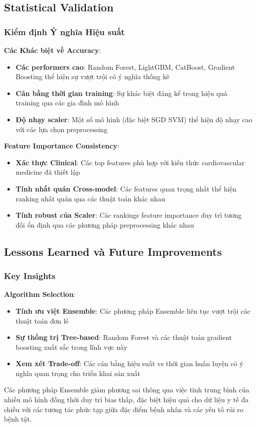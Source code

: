 \subsection{Statistical Validation}\label{subsec:detailed-statistical-validation}

\subsubsection{Kiểm định Ý nghĩa Hiệu suất}

\textbf{Các Khác biệt về Accuracy}:
\begin{itemize}
    \item \textbf{Các performers cao}: Random Forest, LightGBM, CatBoost, Gradient Boosting thể hiện sự vượt trội có ý nghĩa thống kê
    \item \textbf{Cân bằng thời gian training}: Sự khác biệt đáng kể trong hiệu quả training qua các gia đình mô hình
    \item \textbf{Độ nhạy scaler}: Một số mô hình (đặc biệt SGD SVM) thể hiện độ nhạy cao với các lựa chọn preprocessing
\end{itemize}

\textbf{Feature Importance Consistency}:
\begin{itemize}
    \item \textbf{Xác thực Clinical}: Các top features phù hợp với kiến thức cardiovascular medicine đã thiết lập
    \item \textbf{Tính nhất quán Cross-model}: Các features quan trọng nhất thể hiện ranking nhất quán qua các thuật toán khác nhau
    \item \textbf{Tính robust của Scaler}: Các rankings feature importance duy trì tương đối ổn định qua các phương pháp preprocessing khác nhau
\end{itemize}

\subsection{Lessons Learned và Future Improvements}

\subsubsection{Key Insights}

\textbf{Algorithm Selection}:
\begin{itemize}
    \item \textbf{Tính ưu việt Ensemble}: Các phương pháp Ensemble liên tục vượt trội các thuật toán đơn lẻ
    \item \textbf{Sự thống trị Tree-based}: Random Forest và các thuật toán gradient boosting xuất sắc trong lĩnh vực này
    \item \textbf{Xem xét Trade-off}: Các cân bằng hiệu suất vs thời gian huấn luyện có ý nghĩa quan trọng cho triển khai sản xuất
\end{itemize}
Các phương pháp Ensemble giảm phương sai thông qua việc tính trung bình của nhiều mô hình đồng thời duy trì bias thấp, đặc biệt hiệu quả cho dữ liệu y tế đa chiều với các tương tác phức tạp giữa đặc điểm bệnh nhân và các yếu tố rủi ro bệnh tật.

